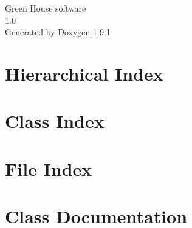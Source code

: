 \let\mypdfximage\pdfximage\def\pdfximage{\immediate\mypdfximage}\documentclass[twoside]{book}
\newcommand{\+}{\discretionary{\mbox{\scriptsize$\hookleftarrow$}}{}{}}
\newcommand{\clearemptydoublepage}{%
  \newpage{\pagestyle{empty}\cleardoublepage}%
}
\begin{document}
\raggedbottom

\hypersetup{pageanchor=false,
             bookmarksnumbered=true,
             pdfencoding=unicode
            }
\begin{titlepage}
\vspace*{7cm}
\begin{center}%
{\Large Green House software \\[1ex]\large 1.\+0 }\\
\vspace*{1cm}
{\large Generated by Doxygen 1.9.1}\\
\end{center}
\end{titlepage}
\clearemptydoublepage
{}
\tableofcontents
\clearemptydoublepage
{}
\hypersetup{pageanchor=true}

\chapter{Hierarchical Index}

\chapter{Class Index}

\chapter{File Index}

\chapter{Class Documentation}


































\end{document}

